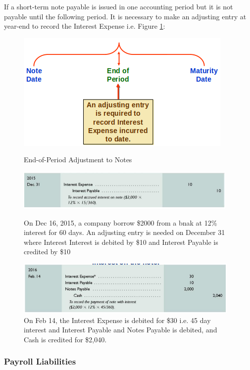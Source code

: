 \documentclass[../main.tex]{subfiles}
\begin{document}
	If a short-term note payable is issued in one accounting period but it is 
	not payable until the following period. It is necessary to make an 
	adjusting entry at year-end to record the Interest Expense i.e. Figure 
	\ref{fig:eopap}:
	\begin{figure}[ht]
		\centering
		\includegraphics[width=0.8\columnwidth]{images/c10_end_period_note_adjustment.png}
		\caption{\label{fig:eopap}End-of-Period Adjustment to Notes}
		
		\includegraphics[width=1\columnwidth]{images/c10_end_note_adjustment1.png}
		\caption{On Dec 16, 2015, a company borrow \$2000 from a bnak at 12\% 
			interest for 60 days. An adjusting entry is needed on December 31 
			where 
			Interest Interest is debited by \$10 and Interest Payable is 
			credited 
			by \$10}
		
		\includegraphics[width=1\columnwidth]{images/c10_end_note_adjustment2.png}
		\caption{On Feb 14, the Interest Expense is debited for \$30 i.e. 45 
			day interest and Interest Payable and Notes Payable is debited, and 
			Cash is credited for \$2,040.}
	\end{figure}
	
	\subsubsection{Payroll Liabilities}
	
\end{document}
